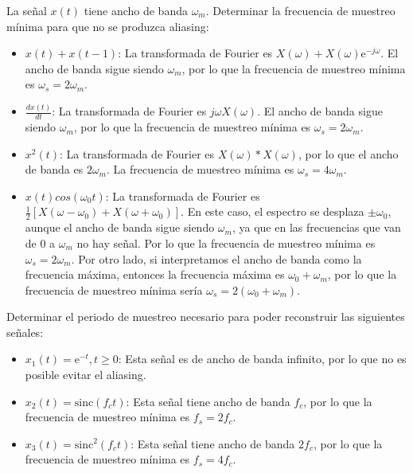 \documentclass[10pt,twoside,spanish,a4paper]{article}
\begin{document}
\vspace{-8em}

	\begin{itemize}
		\itemP La señal $x(t)$ tiene ancho de banda $\omega_m$. Determinar la frecuencia de muestreo mínima para que no se produzca aliasing:
		\begin{itemize}
			\item $x(t) + x(t-1)$: La transformada de Fourier es $X(\omega) + X(\omega)\mathrm{e}^{-j\omega}$. El ancho de banda sigue siendo $\omega_m$, por lo que la frecuencia de muestreo mínima es $\omega_s = 2 \omega_m$.
			\item $\frac{dx(t)}{dt}$: La transformada de Fourier es $j\omega X(\omega)$. El ancho de banda sigue siendo $\omega_m$, por lo que la frecuencia de muestreo mínima es $\omega_s = 2 \omega_m$.
			\item $x^2(t)$: La transformada de Fourier es $X(\omega) * X(\omega)$, por lo que el ancho de banda es $2\omega_m$. La frecuencia de muestreo mínima es $\omega_s = 4 \omega_m$.
			\item $x(t)cos(\omega_0 t)$: La transformada de Fourier es $\frac{1}{2}[X(\omega - \omega_0) + X(\omega + \omega_0)]$. 
			En este caso, el espectro se desplaza $\pm \omega_0$, aunque el ancho de banda sigue siendo $\omega_m$, ya que en las frecuencias que 
			van de 0 a $\omega_m$ no hay señal. Por lo que la frecuencia de muestreo mínima es $\omega_s = 2 \omega_m$.
			Por otro lado, si interpretamos el ancho de banda como la frecuencia máxima, entonces la frecuencia máxima es $\omega_0 + \omega_m$,
			por lo que la frecuencia de muestreo mínima sería $\omega_s = 2(\omega_0 + \omega_m)$.
		\end{itemize}

		\itemP Determinar el periodo de muestreo necesario para poder reconstruir las siguientes señales:
		\begin{itemize}
			\item $x_1(t)=\mathrm{e}^{-t}, t \geq 0$: Esta señal es de ancho de banda infinito, por lo que no es posible evitar el aliasing.
			\item $x_2(t)=\mathrm{sinc}(f_c t)$: Esta señal tiene ancho de banda $f_c$, por lo que la frecuencia de muestreo mínima es $f_s = 2 f_c$.
			\item $x_3(t)=\mathrm{sinc}^2(f_c t)$: Esta señal tiene ancho de banda $2f_c$, por lo que la frecuencia de muestreo mínima es $f_s = 4 f_c$.
		\end{itemize}


\end{itemize}
\end{document}
